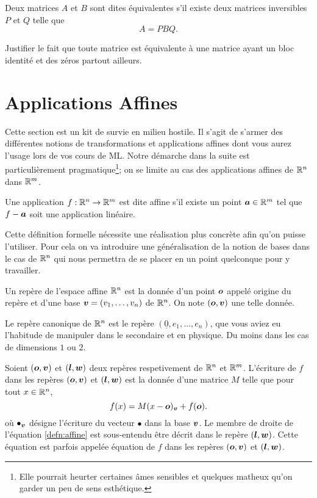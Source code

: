 \documentclass[11pt, a4paper]{article}
\begin{document}
\noindent Deux matrices $A$ et $B$ sont dites équivalentes s'il
existe deux matrices inversibles $P$ et $Q$ telle que
\[
A = PBQ.
\]
\begin{question}
  Justifier le fait que toute matrice est équivalente à une matrice
  ayant un bloc identité et des zéros partout ailleurs.
\end{question}


\section{Applications Affines}
\label{sec:defnappaffine}

Cette section est un kit de survie en milieu hostile. Il s'agit de
s'armer des différentes notions de transformations et applications
affines dont vous aurez l'usage lors de vos cours de ML. Notre
démarche dans la suite est particulièrement pragmatique\footnote{Elle
  pourrait heurter certaines âmes sensibles et quelques matheux qu'on
  garder un peu de sens esthétique.}; on se limite au cas des
applications affines de $\mathbb{R}^n$ dans $\mathbb{R}^m$.
\begin{defn}
  Une application $f : \mathbb{R}^n \to \mathbb{R}^m$ est dite affine s'il existe un
  point $\boldsymbol{a} \in \mathbb{R}^m$ tel que $f - \boldsymbol{a}$ soit une application
  linéaire.
\end{defn}
\noindent Cette définition formelle nécessite une réalisation plus concrète afin
qu'on puisse l'utiliser. Pour cela on va introduire une généralisation
de la notion de bases dans le cas de $\mathbb{R}^n$ qui nous permettra de se
placer en un point quelconque pour y travailler.
\begin{defn}
  Un repère de l'espace affine $\mathbb{R}^n$ est la donnée d'un point
  $\boldsymbol{o}$ appelé origine du repère et d'une base
  $\boldsymbol{v} = (v_1, \ldots, v_n)$ de $\mathbb{R}^n$. On note
  $(\boldsymbol{o}, \boldsymbol{v})$ une telle donnée.
\end{defn}
\noindent Le repère canonique de $\mathbb{R}^n$ est le repère
$(\underline{0}, e_1, \ldots, e_n)$, que vous aviez eu l'habitude de
manipuler dans le secondaire et en physique. Du moins dans les cas de
dimensions $1$ ou $2$.
\begin{defn}
  Soient $(\boldsymbol{o}, \boldsymbol{v})$ et $(\boldsymbol{l}, \boldsymbol{w})$ deux repères
  respetivement de $\mathbb{R}^n$ et $\mathbb{R}^m$. L'écriture de $f$ dans les
  repères $(\boldsymbol{o}, \boldsymbol{v})$ et $(\boldsymbol{l}, \boldsymbol{w})$ est la donnée d'une
  matrice $M$ telle que pour tout $x \in \mathbb{R}^n$,
  \begin{equation}
    \label{defn:affine}
    f(x) = M(x - \boldsymbol{o})_{\boldsymbol{v}} + f(\boldsymbol{o}).
  \end{equation}
  où $\bullet_{\boldsymbol{v}}$ désigne l'écriture du vecteur $\bullet$ dans
  la base $\boldsymbol{v}$. Le membre de droite de l'équation
  \ref{defn:affine} est sous-entendu être décrit dans le repère
  $(\boldsymbol{l}, \boldsymbol{w})$. Cette équation est parfois appelée équation de
  $f$ dans les repères $(\boldsymbol{o}, \boldsymbol{v})$ et $(\boldsymbol{l}, \boldsymbol{w})$.
\end{defn}
\end{document}
